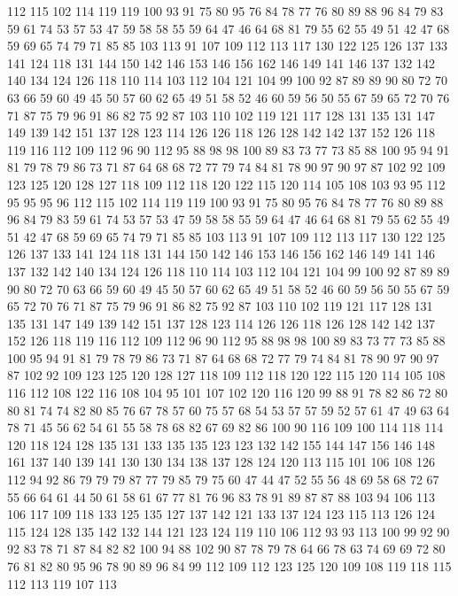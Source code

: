 112 115 102 114 119 119 100 93 91 75 80 95 76 84 78 77 76 80 89 88
96 84 79 83 59 61 74 53 57 53 47 59 58 58 55 59 64 47 46 64
68 81 79 55 62 55 49 51 42 47 68 59 69 65 74 79 71 85 85 103
113 91 107 109 112 113 117 130 122 125 126 137 133 141 124 118 131 144 150 142
146 153 146 156 162 146 149 141 146 137 132 142 140 134 124 126 118 110 114 103
112 104 121 104 99 100 92 87 89 89 90 80 72 70 63 66 59 60 49 45
50 57 60 62 65 49 51 58 52 46 60 59 56 50 55 67 59 65 72 70
76 71 87 75 79 96 91 86 82 75 92 87 103 110 102 119 121 117 128 131
135 131 147 149 139 142 151 137 128 123 114 126 126 118 126 128 142 142 137 152
126 118 119 116 112 109 112 96 90 112 95 88 98 98 100 89 83 73 77 73
85 88 100 95 94 91 81 79 78 79 86 73 71 87 64 68 68 72 77 79
74 84 81 78 90 97 90 97 87 102 92 109 123 125 120 128 127 118 109 112
118 120 122 115 120 114 105 108 103 93 95 112 95 95 95 96 112 115 102 114
119 119 100 93 91 75 80 95 76 84 78 77 76 80 89 88 96 84 79 83
59 61 74 53 57 53 47 59 58 58 55 59 64 47 46 64 68 81 79 55
62 55 49 51 42 47 68 59 69 65 74 79 71 85 85 103 113 91 107 109
112 113 117 130 122 125 126 137 133 141 124 118 131 144 150 142 146 153 146 156
162 146 149 141 146 137 132 142 140 134 124 126 118 110 114 103 112 104 121 104
99 100 92 87 89 89 90 80 72 70 63 66 59 60 49 45 50 57 60 62
65 49 51 58 52 46 60 59 56 50 55 67 59 65 72 70 76 71 87 75
79 96 91 86 82 75 92 87 103 110 102 119 121 117 128 131 135 131 147 149
139 142 151 137 128 123 114 126 126 118 126 128 142 142 137 152 126 118 119 116
112 109 112 96 90 112 95 88 98 98 100 89 83 73 77 73 85 88 100 95
94 91 81 79 78 79 86 73 71 87 64 68 68 72 77 79 74 84 81 78
90 97 90 97 87 102 92 109 123 125 120 128 127 118 109 112 118 120 122 115
120 114 105 108 116 112 108 122 116 108 104 95 101 107 102 120 116 120 99 88
91 78 82 86 72 80 80 81 74 74 82 80 85 76 67 78 57 60 75 57
68 54 53 57 57 59 52 57 61 47 49 63 64 78 71 45 56 62 54 61
55 58 78 68 82 67 69 82 86 100 90 116 109 100 114 118 114 120 118 124
128 135 131 133 135 135 123 123 132 142 155 144 147 156 146 148 161 137 140 139
141 130 130 134 138 137 128 124 120 113 115 101 106 108 126 112 94 92 86 79
79 79 87 77 79 85 79 75 60 47 44 47 52 55 56 48 69 58 68 72
67 55 66 64 61 44 50 61 58 61 67 77 81 76 96 83 78 91 89 87
87 88 103 94 106 113 106 117 109 118 133 125 135 127 137 142 121 133 137 124
123 115 113 126 124 115 124 128 135 142 132 144 121 123 124 119 110 106 112 93
93 113 100 99 92 90 92 83 78 71 87 84 82 82 100 94 88 102 90 87
78 79 78 64 66 78 63 74 69 69 72 80 76 81 82 80 95 96 78 90
89 96 84 99 112 109 112 123 125 120 109 108 119 118 115 112 113 119 107 113
